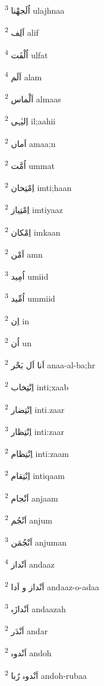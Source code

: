\documentclass[12pt]{article}
\begin{document}
\begin{multicols}{5}
{\ur اُلَجھْنا}   \textsuperscript{3} ulajhnaa

{\ur اَلِف}   \textsuperscript{2} alif

{\ur اُلْفَت}   \textsuperscript{4} ulfat

{\ur اَلَم}   \textsuperscript{4} alam

{\ur اَلْماس}   \textsuperscript{2} almaas

{\ur اِلیٰہی}   \textsuperscript{2} il;aahii

{\ur اَماں}   \textsuperscript{2} amaa;n

{\ur اُمَّت}   \textsuperscript{2} ummat

{\ur اِمْتِحان}   \textsuperscript{2} imti;haan

{\ur اِمْتِیاز}   \textsuperscript{2} imtiyaaz

{\ur اِمْکان}   \textsuperscript{2} imkaan

{\ur اَمْن}   \textsuperscript{2} amn

{\ur اُمِید}   \textsuperscript{3} umiid

{\ur اُمِّید}   \textsuperscript{3} ummiid

{\ur اِن}   \textsuperscript{2} in

{\ur اُن}   \textsuperscript{2} un

{\ur اَنا اَل بَحْر}   \textsuperscript{2} anaa-al-ba;hr

{\ur اِنْتِخاب}   \textsuperscript{2} inti;xaab

{\ur اِنْتِضار}   \textsuperscript{2} inti.zaar

{\ur اِنْتِظار}   \textsuperscript{3} inti:zaar

{\ur اِنْتِظام}   \textsuperscript{2} inti:zaam

{\ur اِنْتِقام}   \textsuperscript{2} intiqaam

{\ur اَنْجام}   \textsuperscript{2} anjaam

{\ur اَنْجُم}   \textsuperscript{2} anjum

{\ur اَنْجُمَن}   \textsuperscript{3} anjuman

{\ur اَنْداز}   \textsuperscript{4} andaaz

{\ur اَنْداز و اَدا}   \textsuperscript{2} andaaz-o-adaa

{\ur اَنْدازَہ}   \textsuperscript{3} andaazah

{\ur اَنْدَر}   \textsuperscript{2} andar

{\ur اَنْدوہ}   \textsuperscript{2} andoh

{\ur اَنْدوہ رُبا}   \textsuperscript{2} andoh-rubaa


\end{multicols}
\end{document}
